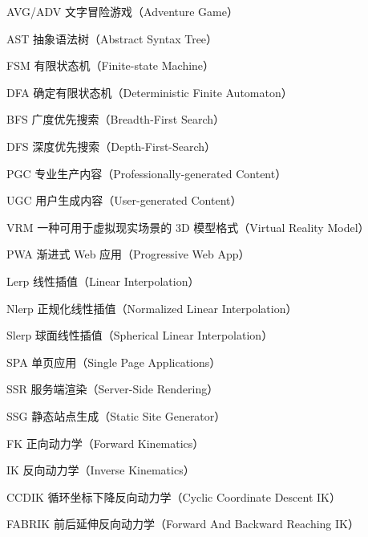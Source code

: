 
\begin{denotation}[3cm]
  \item[AVG/ADV] 文字冒险游戏（Adventure Game）
  \item[AST] 抽象语法树（Abstract Syntax Tree）
  \item[FSM] 有限状态机（Finite-state Machine）
  \item[DFA] 确定有限状态机（Deterministic Finite Automaton）
  \item[BFS] 广度优先搜索（Breadth-First Search）
  \item[DFS] 深度优先搜索（Depth-First-Search）
  \item[PGC] 专业生产内容（Professionally-generated Content）
  \item[UGC] 用户生成内容（User-generated Content）
  \item[VRM] 一种可用于虚拟现实场景的 3D 模型格式（Virtual Reality Model）
  \item[PWA] 渐进式 Web 应用（Progressive Web App）
  \item[Lerp] 线性插值（Linear Interpolation）
  \item[Nlerp] 正规化线性插值（Normalized Linear Interpolation）
  \item[Slerp] 球面线性插值（Spherical Linear Interpolation）
  \item[SPA] 单页应用（Single Page Applications）
  \item[SSR] 服务端渲染（Server-Side Rendering）
  \item[SSG] 静态站点生成（Static Site Generator） 
  \item[FK] 正向动力学（Forward Kinematics）
  \item[IK] 反向动力学（Inverse Kinematics）
  \item[CCDIK] 循环坐标下降反向动力学（Cyclic Coordinate Descent IK）
  \item[FABRIK] 前后延伸反向动力学（Forward And Backward Reaching IK）
\end{denotation}
